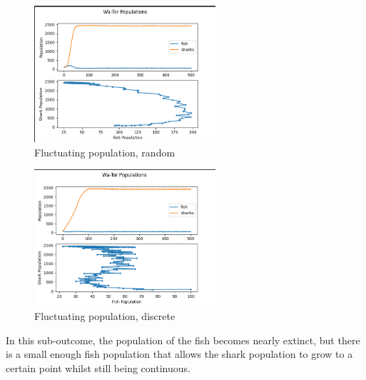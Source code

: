 \documentclass[12pt]{iopart} %
\begin{document}
\begin{figure}[h!tbp]
  \begin{center}
  \item[]\includegraphics[width=0.6\textwidth]{figure9.png}
  \caption{\label{fig:figure9}
  Fluctuating population, random
  }
  \end{center}
\end{figure}

\begin{figure}[h!tbp]
  \begin{center}
  \item[]\includegraphics[width=0.6\textwidth]{figure10.png}
  \caption{\label{fig:figure10}
  Fluctuating population, discrete
  }
  \end{center}
\end{figure}

In this sub-outcome, the population of the fish becomes nearly extinct, but there is a small enough fish population that allows the shark population to grow to a certain point whilst still being continuous.
\end{document}
